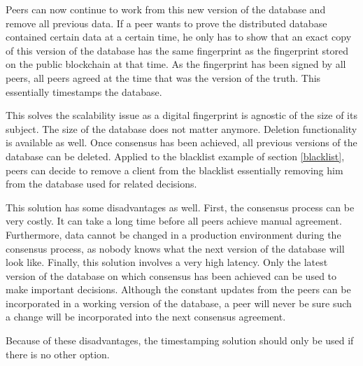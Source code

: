 Peers can now continue to work from this new version of the database and remove all previous data. If a peer wants to prove the distributed database contained certain data at a certain time, he only has to show that an exact copy of this version of the database has the same fingerprint as the fingerprint stored on the public blockchain at that time. As the fingerprint has been signed by all peers, all peers agreed at the time that was the version of the truth. This essentially timestamps the database.


This solves the scalability issue as a digital fingerprint is agnostic of the size of its subject. The size of the database does not matter anymore. Deletion functionality is available as well. Once consensus has been achieved, all previous versions of the database can be deleted. Applied to the blacklist example of section \ref{blacklist}, peers can decide to remove a client from the blacklist essentially removing him from the database used for related decisions.


\iffalse
disadvantages: 
- very costly consensus process: manual agreement on the data can take a long time, during the consensus process, the data cannot be changed in a production environment.
- very high latency: only the database on which there has been achieved consensus can be used to make important decisions. the constant changes from peers can be incorporated into small decisions, but a peer is never sure such a change will be incorporated in the next consensus agreement.
\fi

This solution has some disadvantages as well. First, the consensus process can be very costly. It can take a long time before all peers achieve manual agreement. Furthermore, data cannot be changed in a production environment during the consensus process, as nobody knows what the next version of the database will look like. Finally, this solution involves a very high latency. Only the latest version of the database on which consensus has been achieved can be used to make important decisions. Although the constant updates from the peers can be incorporated in a working version of the database, a peer will never be sure such a change will be incorporated into the next consensus agreement.

Because of these disadvantages, the timestamping solution should only be used if there is no other option.